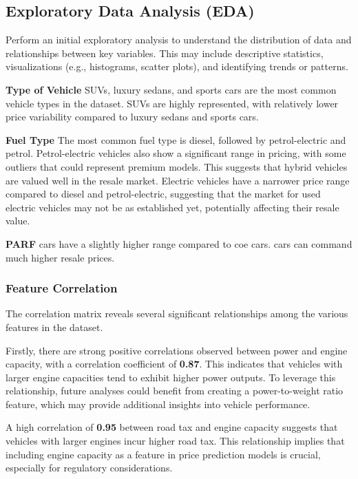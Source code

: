 \documentclass[conference]{IEEEtran}
\begin{document}
\subsection{Exploratory Data Analysis (EDA)}
\label{subsec:eda}
{\small Perform an initial exploratory analysis to understand the distribution of data and relationships between key variables. This may include descriptive statistics, visualizations (e.g., histograms, scatter plots), and identifying trends or patterns.}

\textbf{Type of Vehicle} SUVs, luxury sedans, and sports cars are the most common vehicle types in the dataset. SUVs are highly represented, with relatively lower price variability compared to luxury sedans and sports cars.

\textbf{Fuel Type} The most common fuel type is diesel, followed by petrol-electric and petrol.
Petrol-electric vehicles also show a significant range in pricing, with some outliers that could represent premium models. This suggests that hybrid vehicles are valued well in the resale market.
Electric vehicles have a narrower price range compared to diesel and petrol-electric, suggesting that the market for used electric vehicles may not be as established yet, potentially affecting their resale value.

\textbf{PARF} cars have a slightly higher range compared to coe cars.  cars can command much higher resale prices.
\subsubsection{Feature Correlation}

The correlation matrix reveals several significant relationships among the various features in the dataset. 

Firstly, there are strong positive correlations observed between power and engine capacity, with a correlation coefficient of \textbf{0.87}. This indicates that vehicles with larger engine capacities tend to exhibit higher power outputs. To leverage this relationship, future analyses could benefit from creating a power-to-weight ratio feature, which may provide additional insights into vehicle performance.

A high correlation of \textbf{0.95} between road tax and engine capacity suggests that vehicles with larger engines incur higher road tax. This relationship implies that including engine capacity as a feature in price prediction models is crucial, especially for regulatory considerations. 
\end{document}
